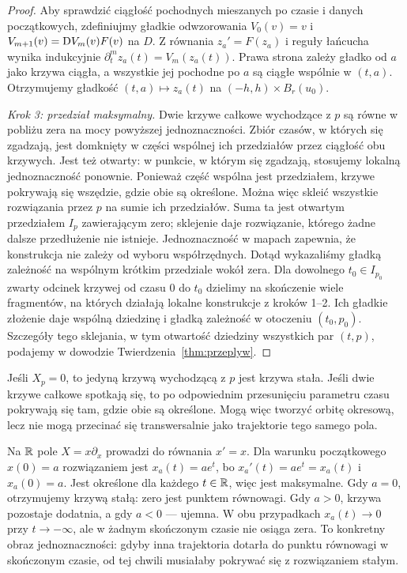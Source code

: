 \begin{proof}
Aby sprawdzić ciągłość pochodnych mieszanych po czasie i danych
początkowych, zdefiniujmy gładkie odwzorowania
$V_0(v)=v$ i $V_{m+1}(v)=\mathrm D V_m(v)F(v)$ na $D$.
Z równania $z_a'=F(z_a)$ i reguły łańcucha wynika indukcyjnie
$\partial_t^m z_a(t)=V_m(z_a(t))$. Prawa strona zależy
gładko od $a$ jako krzywa ciągła, a wszystkie jej pochodne
po $a$ są ciągłe wspólnie w $(t,a)$. Otrzymujemy gładkość
$(t,a)\mapsto z_a(t)$ na $(-h,h)\times B_r(u_0)$.

\emph{Krok 3: przedział maksymalny.}
Dwie krzywe całkowe wychodzące z $p$ są równe w pobliżu zera
na mocy powyższej jednoznaczności. Zbiór czasów, w których
się zgadzają, jest domknięty w części wspólnej ich
przedziałów przez ciągłość obu krzywych. Jest też otwarty:
w punkcie, w którym się zgadzają, stosujemy lokalną
jednoznaczność ponownie. Ponieważ część wspólna jest przedziałem,
krzywe pokrywają się wszędzie, gdzie obie są określone.
Można więc skleić wszystkie rozwiązania przez $p$ na sumie
ich przedziałów. Suma ta jest otwartym przedziałem $I_p$
zawierającym zero; sklejenie daje rozwiązanie, którego żadne
dalsze przedłużenie nie istnieje. Jednoznaczność w mapach
zapewnia, że konstrukcja nie zależy od wyboru współrzędnych.
Dotąd wykazaliśmy gładką zależność na wspólnym krótkim przedziale
wokół zera. Dla dowolnego $t_0\in I_{p_0}$ zwarty odcinek krzywej
od czasu $0$ do $t_0$ dzielimy na skończenie wiele fragmentów,
na których działają lokalne konstrukcje z kroków 1--2.
Ich gładkie złożenie daje wspólną dziedzinę i gładką zależność
w otoczeniu $(t_0,p_0)$. Szczegóły tego sklejania,
w tym otwartość dziedziny wszystkich par $(t,p)$,
podajemy w dowodzie Twierdzenia~\ref{thm:przeplyw}.
\end{proof}

Jeśli $X_p=0$, to jedyną krzywą wychodzącą z $p$ jest krzywa stała.
Jeśli dwie krzywe całkowe spotkają się, to po odpowiednim przesunięciu
parametru czasu pokrywają się tam, gdzie obie są określone.
Mogą więc tworzyć orbitę okresową, lecz nie mogą przecinać się
transwersalnie jako trajektorie tego samego pola.

\begin{przyklad}
Na $\mathbb{R}$ pole $X=x\partial_x$ prowadzi do równania $x'=x$.
Dla warunku początkowego $x(0)=a$ rozwiązaniem jest
$x_a(t)=ae^t$, bo $x_a'(t)=ae^t=x_a(t)$ i $x_a(0)=a$.
Jest określone dla każdego $t\in\mathbb{R}$, więc jest maksymalne.
Gdy $a=0$, otrzymujemy krzywą stałą: zero jest punktem
równowagi. Gdy $a>0$, krzywa pozostaje dodatnia, a gdy $a<0$
--- ujemna. W obu przypadkach $x_a(t)\to0$ przy $t\to-\infty$,
ale w żadnym skończonym czasie nie osiąga zera.
To konkretny obraz jednoznaczności: gdyby inna trajektoria
dotarła do punktu równowagi w skończonym czasie, od tej chwili
musiałaby pokrywać się z rozwiązaniem stałym.
\end{przyklad}

